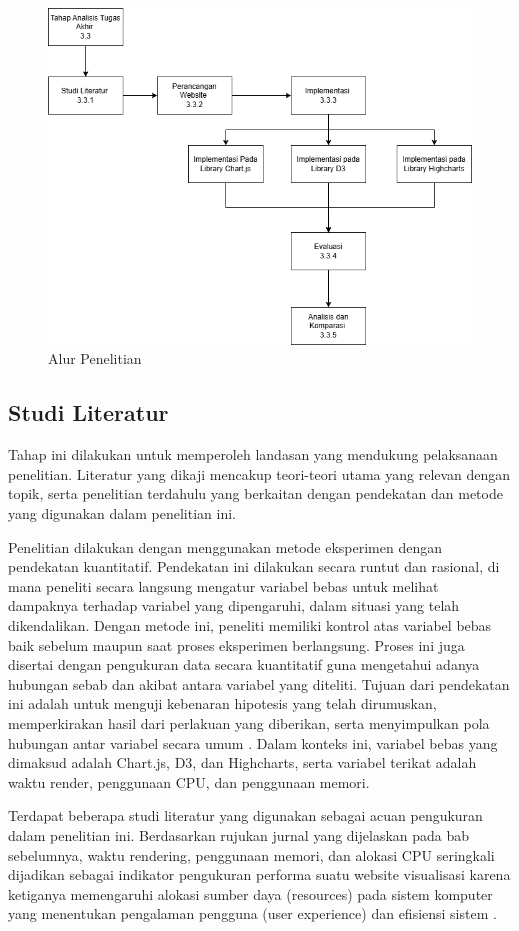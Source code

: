 \begin{figure}[H]
	\centering
	\includegraphics[width=0.8\linewidth]{gambar/Metodologi/Alur penelitian.png}
	\caption{Alur Penelitian}
	\label{Alur Penelitian}
\end{figure}

\subsection{Studi Literatur}
Tahap ini dilakukan untuk memperoleh landasan yang mendukung pelaksanaan penelitian. Literatur yang dikaji mencakup teori-teori utama yang relevan dengan topik, serta penelitian terdahulu yang berkaitan dengan pendekatan dan metode yang digunakan dalam penelitian ini. 

Penelitian dilakukan dengan menggunakan metode eksperimen dengan pendekatan kuantitatif. Pendekatan ini dilakukan secara runtut dan rasional, di mana peneliti secara langsung mengatur variabel bebas untuk melihat dampaknya terhadap variabel yang dipengaruhi, dalam situasi yang telah dikendalikan. Dengan metode ini, peneliti memiliki kontrol atas variabel bebas baik sebelum maupun saat proses eksperimen berlangsung. Proses ini juga disertai dengan pengukuran data secara kuantitatif guna mengetahui adanya hubungan sebab dan akibat antara variabel yang diteliti. Tujuan dari pendekatan ini adalah untuk menguji kebenaran hipotesis yang telah dirumuskan, memperkirakan hasil dari perlakuan yang diberikan, serta menyimpulkan pola hubungan antar variabel secara umum \cite{Akbar}. Dalam konteks ini, variabel bebas yang dimaksud adalah Chart.js, D3, dan Highcharts, serta variabel terikat adalah waktu render, penggunaan CPU, dan penggunaan memori.

Terdapat beberapa studi literatur yang digunakan sebagai acuan pengukuran dalam penelitian ini. Berdasarkan rujukan jurnal yang dijelaskan pada bab sebelumnya, waktu rendering, penggunaan memori, dan alokasi CPU seringkali dijadikan sebagai indikator pengukuran performa suatu website visualisasi karena ketiganya memengaruhi alokasi sumber daya (resources) pada sistem komputer yang menentukan pengalaman pengguna (user experience) dan efisiensi sistem \cite{Persson2021}\cite{Bostrm2022}\cite{Flask}.


